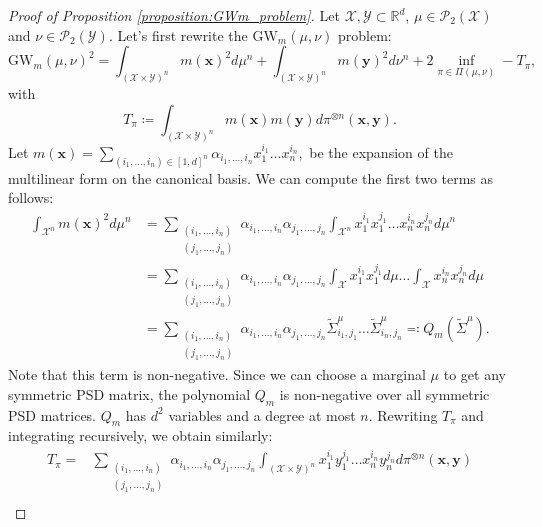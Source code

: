 \documentclass{article}
\newcommand{\R}{\mathbb{R}}
\newcommand{\Y}{\mathcal{Y}}
\newcommand{\X}{\mathcal{X}}
\newcommand{\1}{\mathbf{1}}
\newcommand{\GW}{\mathrm{GW}}
\renewcommand{\P}{\mathcal{P}}
\theoremstyle{definition}
\theoremstyle{remark}
\begin{document}
\begin{appendices}
\begin{proof}[Proof of Proposition \ref{proposition:GWm_problem}]
    Let $\X,\Y\subset \R^d$, $\mu\in \P_2(\X)$  and $\nu\in \P_2(\Y)$.   Let's first rewrite the $\GW_m(\mu,\nu)$ problem:
    \begin{equation*}
            \GW_m(\mu,\nu)^2
            =\int_{(\X\times\Y)^n}m(\mathbf{x})^2d\mu^{ n}+\int_{(\X\times\Y)^n}m(\mathbf{y})^2d\nu^{n}+2\inf_{\pi\in\Pi(\mu,\nu)} - T_\pi,
    \end{equation*}
    with 
    \begin{equation}\label{eq:T_pi}
        T_\pi\coloneqq \int_{(\X\times\Y)^n}m(\mathbf{x})m(\mathbf{y})d\pi^{\otimes n}(\mathbf{x},\mathbf{y}).
    \end{equation}
    Let $m(\mathbf{x})=\sum_{(i_1,\dots,i_n)\in [1,d]^n}\alpha_{i_1,\dots,i_n}x_1^{i_1}\dots x_n^{i_n},$ be the expansion of the multilinear form on the canonical basis. We can compute the first two terms as follows:
    \begin{equation*}
        \begin{split}
            \int_{\X^n}m(\mathbf{x})^2d\mu^{ n}
            &=\sum_{\substack{(i_1,\dots,i_n)\\(j_1,\dots,j_n)}}\alpha_{i_1,\dots,i_n}\alpha_{j_1,\dots,j_n}\int_{\X^n}x_1^{i_1}x_1^{j_1}\dots x_n^{i_n} x_n^{j_n}d\mu^n\\
            &=\sum_{\substack{(i_1,\dots,i_n)\\(j_1,\dots,j_n)}}\alpha_{i_1,\dots,i_n}\alpha_{j_1,\dots,j_n}\int_{\X}x_1^{i_1}x_1^{j_1}d\mu\dots \int_{\X}x_n^{i_n}x_n^{j_n}d\mu\\
            &= \sum_{\substack{(i_1,\dots,i_n)\\(j_1,\dots,j_n)}}\alpha_{i_1,\dots,i_n}\alpha_{j_1,\dots,j_n} \tilde{\Sigma}^\mu_{i_1,j_1}\dots \tilde{\Sigma}^\mu_{i_n,j_n}\eqqcolon Q_m(\tilde{\Sigma}^{\mu}).
        \end{split}
    \end{equation*}
    Note that this term is non-negative. Since we can choose a marginal $\mu$ to get any symmetric PSD matrix, the polynomial $Q_m$ is non-negative over all symmetric PSD matrices. $Q_m$ has $d^2$ variables and a degree at most $n$.
    Rewriting $T_\pi$ and integrating recursively, we obtain similarly:
        \begin{equation*}
               \begin{split}
                T_\pi
                =&\sum_{\substack{(i_1,\dots,i_n)\\(j_1,\dots,j_n)}}\alpha_{i_1,\dots,i_n}\alpha_{j_1,\dots,j_n}\int_{(\X\times\Y)^n}x_1^{i_1}y_1^{j_1}\dots x_n^{i_n} y_n^{j_n}d\pi^{\otimes n}(\mathbf{x},\mathbf{y})\\

\end{split}
\end{equation*}
\end{proof}
\end{appendices}
\end{document}
